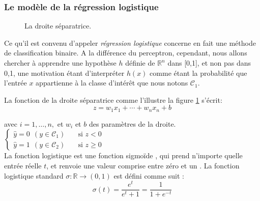 	
	
	\subsubsection{Le modèle de la régression logistique} \label{subsec:reg_logistique}
	
	\begin{figure}
		\caption{La droite séparatrice.}\label{fig:classification_2case}
	\end{figure}
	Ce qu'il est convenu d'appeler \textit{régression logistique} concerne en fait une méthode de classification binaire. 
	A la différence du perceptron, cependant, nous allons chercher à apprendre une hypothèse $h$ définie de $\mathbb{R}^n$ dans [0,1], et non pas dans {0,1},  une motivation étant d'interpréter $h(x)$ comme étant la probabilité que l'entrée $x$ appartienne à la classe d'intérêt que nous notons $\mathcal{C}_1$. \cite{antoine2018apprentissage}
	
	La fonction de la droite séparatrice comme l'illustre la figure \ref{fig:classification_2case} s'écrit:
	\begin{equation}\label{eq:droite_sep}
	z = w _{1}x_{1}+\cdots +w_{n}x_{n}+b
	\end{equation}
	
	avec $ i=1,\ldots ,n,$ et $w_i$ et $b$ des paramètres de la droite.  %
	\\
	$
	\begin{cases}
	\hat{y}=0 \ \ (y \in \mathcal{C}_1) & \quad \text{si  } z < 0\\
	\hat{y}=1 \ \ (y \in \mathcal{C}_2) & \quad \text{si  } z \geq 0
	\end{cases}
	$\\
	
	La fonction logistique est une fonction sigmoïde , qui prend n'importe quelle entrée réelle $t$, et renvoie une valeur comprise entre zéro et un \cite{ml2008python}. La fonction logistique standard ${\displaystyle \sigma :\mathbb {R} \rightarrow (0,1)}$ est défini comme suit :
	\begin{equation} \label{eq:sigmoid-simple}
	\sigma (t)={\frac {e^{t}}{e^{t}+1}}={\frac {1}{1+e^{-t}}}
	\end{equation}
	
